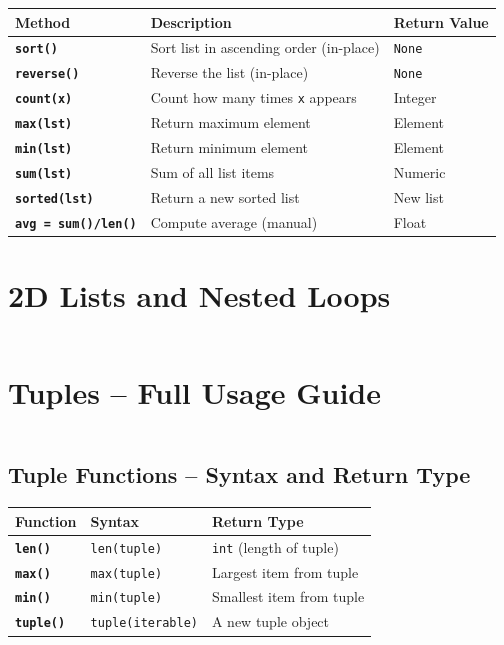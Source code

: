 \documentclass[a4paper,11pt]{article}
\begin{document}
	\begin{tabular}{>{\bfseries}p{3.5cm} p{6cm} p{3.5cm}}
		\toprule
		Method & Description & Return Value \\
		\midrule
		
		\texttt{sort()}        & Sort list in ascending order (in-place) & \texttt{None} \\
		\texttt{reverse()}     & Reverse the list (in-place) & \texttt{None} \\
		\texttt{count(x)}      & Count how many times \texttt{x} appears & Integer \\
		\texttt{max(lst)}      & Return maximum element & Element \\
		\texttt{min(lst)}      & Return minimum element & Element \\
		\texttt{sum(lst)}      & Sum of all list items & Numeric \\
		\texttt{sorted(lst)}   & Return a new sorted list & New list \\
		\texttt{avg = sum()/len()} & Compute average (manual) & Float \\
		
		\bottomrule
	\end{tabular}
	
		\newpage
	\section{2D Lists and Nested Loops}
	\inputminted{python}{Python_Files/nested_list_guid.py}
	
		\newpage
		
	\section{Tuples – Full Usage Guide}
	\inputminted{python}{Python_Files/tuples_guid.py}
	
	\vspace{1em}
	\subsection*{Tuple Functions – Syntax and Return Type}
	
	\begin{tabular}{>{\bfseries}p{3.5cm} p{7cm} p{3cm}}
		\toprule
		Function & Syntax & Return Type \\
		\midrule
		
		\texttt{len()} & \texttt{len(tuple)} & \texttt{int} (length of tuple) \\
		
		\texttt{max()} & \texttt{max(tuple)} & Largest item from tuple \\
		
		\texttt{min()} & \texttt{min(tuple)} & Smallest item from tuple \\
		
		\texttt{tuple()} & \texttt{tuple(iterable)} & A new tuple object \\
		
		\bottomrule
	\end{tabular}
	
\end{document}
